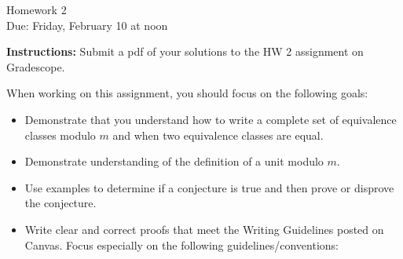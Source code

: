 \documentclass[12pt]{article}
\begin{document}
\begin{center}
{\Large Homework 2}\\
Due: Friday,  February 10 at noon\\


\end{center}
{\bf Instructions:} Submit a pdf of your solutions to the HW 2 assignment on Gradescope. 

When working on this assignment, you should focus on the following goals:
\begin{itemize}
\item Demonstrate that you understand how to write a complete set of equivalence classes modulo $m$ and when two equivalence classes are equal. 
\item Demonstrate understanding of the definition of a unit modulo $m$.  
\item Use examples to determine if a conjecture is true and then prove or disprove the conjecture. 
\item Write clear and correct proofs that meet the Writing Guidelines posted on Canvas. Focus especially on the following guidelines/conventions:
\end{itemize}
\end{document}
